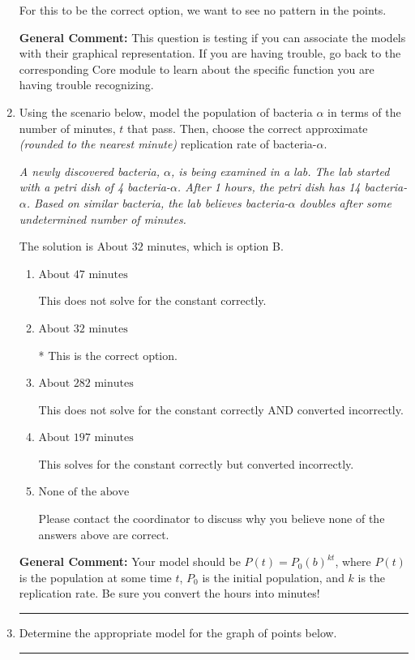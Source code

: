 \documentclass{extbook}[14pt]
\newcommand{\litem}[1]{\item #1

\rule{\textwidth}{0.4pt}}
\begin{document}
\begin{enumerate}
{\begin{enumerate}[label=\Alph*.]
For this to be the correct option, we want to see no pattern in the points.
\end{enumerate}

\textbf{General Comment:} This question is testing if you can associate the models with their graphical representation. If you are having trouble, go back to the corresponding Core module to learn about the specific function you are having trouble recognizing.
}
\litem{
Using the scenario below, model the population of bacteria $\alpha$ in terms of the number of minutes, $t$ that pass. Then, choose the correct approximate \textit{(rounded to the nearest minute)} replication rate of bacteria-$\alpha$.

\begin{center}
    \textit{ A newly discovered bacteria, $\alpha$, is being examined in a lab. The lab started with a petri dish of 4 bacteria-$\alpha$. After 1 hours, the petri dish has 14 bacteria-$\alpha$. Based on similar bacteria, the lab believes bacteria-$\alpha$ doubles after some undetermined number of minutes. }
\end{center}
The solution is \( \text{About } 32 \text{ minutes} \), which is option B.\begin{enumerate}[label=\Alph*.]
\item \( \text{About } 47 \text{ minutes} \)

This does not solve for the constant correctly.
\item \( \text{About } 32 \text{ minutes} \)

* This is the correct option.
\item \( \text{About } 282 \text{ minutes} \)

This does not solve for the constant correctly AND converted incorrectly.
\item \( \text{About } 197 \text{ minutes} \)

This solves for the constant correctly but converted incorrectly.
\item \( \text{None of the above} \)

Please contact the coordinator to discuss why you believe none of the answers above are correct.
\end{enumerate}

\textbf{General Comment:} Your model should be $P(t) = P_0(b)^{kt}$, where $P(t)$ is the population at some time $t$, $P_0$ is the initial population, and $k$ is the replication rate. Be sure you convert the hours into minutes!
}
\litem{
Determine the appropriate model for the graph of points below.

}
\end{enumerate}
\end{document}
